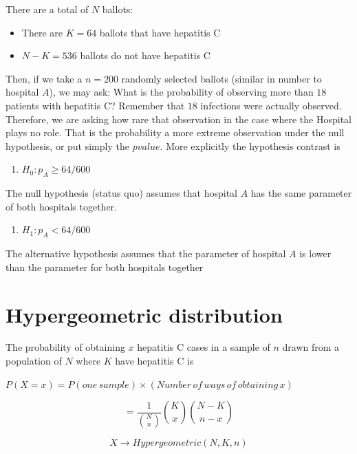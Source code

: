 \documentclass[
]{book}
\providecommand{\tightlist}{%
  \setlength{\itemsep}{0pt}\setlength{\parskip}{0pt}}
\begin{document}
There are a total of \(N\) ballots:

\begin{itemize}
\tightlist
\item
  There are \(K=64\) ballots that have hepatitis C
\item
  \(N-K=536\) ballots do not have hepatitis C
\end{itemize}

Then, if we take a \(n=200\) randomly selected ballots (similar in number to hospital \(A\)), we may ask: What is the probability of observing more than \(18\) patients with hepatitis C? Remember that \(18\) infections were actually observed. Therefore, we are asking how rare that observation in the case where the Hospital plays no role. That is the probability a more extreme observation under the null hypothesis, or put simply the \(pvalue\). More explicitly the hypothesis contrast is

\begin{enumerate}
\def\labelenumi{\alph{enumi}.}
\tightlist
\item
  \(H_0: p_A \geq 64/600\)
\end{enumerate}

The null hypothesis (status quo) assumes that hospital \(A\) has the same parameter of both hospitals together.

\begin{enumerate}
\def\labelenumi{\alph{enumi}.}
\setcounter{enumi}{1}
\tightlist
\item
  \(H_1: p_A < 64/600\)
\end{enumerate}

The alternative hypothesis assumes that the parameter of hospital \(A\) is lower than the parameter for both hospitals together

\hypertarget{hypergeometric-distribution}{%
\section{Hypergeometric distribution}\label{hypergeometric-distribution}}

The probability of obtaining \(x\) hepatitis C cases in a sample of \(n\) drawn from a population of \(N\) where \(K\) have hepatitis C is

\(P(X=x)=P(one\,sample) \times (Number\, of\, ways\, of\, obtaining\, x)\)

\[=\frac{1}{\binom N n}\binom K x \binom {N-K} {n-x}\]

\[X \rightarrow Hypergeometric(N,K,n)\]
\end{document}
